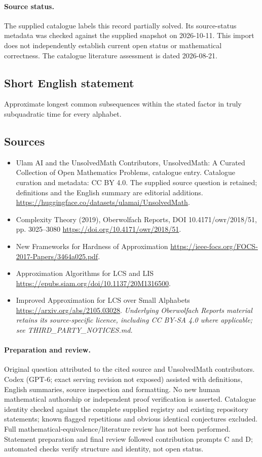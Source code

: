\documentclass[11pt]{article}
\begin{document}
\paragraph{Source status.}
The supplied catalogue labels this record partially solved. Its source-status metadata was checked against the supplied snapshot on 2026-10-11. This import does not independently establish current open status or mathematical correctness. The catalogue literature assessment is dated 2026-08-21.
\subsection{Short English statement}
Approximate longest common subsequences within the stated factor in truly subquadratic time for every alphabet.
\subsection{Sources}
\begin{itemize}
\item[S1] Ulam AI and the UnsolvedMath Contributors, UnsolvedMath: A Curated Collection of Open Mathematics Problems, catalogue entry. Catalogue curation and metadata: CC BY 4.0. The supplied source question is retained; definitions and the English summary are editorial additions.
\url{https://huggingface.co/datasets/ulamai/UnsolvedMath}.
\item[S2] Complexity Theory (2019), Oberwolfach Reports, DOI 10.4171/owr/2018/51, pp. 3025--3080
\url{https://doi.org/10.4171/owr/2018/51}.
\item[S3] New Frameworks for Hardness of Approximation
\url{https://ieee-focs.org/FOCS-2017-Papers/3464a025.pdf}.
\item[S4] Approximation Algorithms for LCS and LIS
\url{https://epubs.siam.org/doi/10.1137/20M1316500}.
\item[S5] Improved Approximation for LCS over Small Alphabets
\url{https://arxiv.org/abs/2105.03028}.
\textit{Underlying Oberwolfach Reports material retains its source-specific licence, including CC BY-SA 4.0 where applicable; see THIRD\_PARTY\_NOTICES.md.}
\end{itemize}
\paragraph{Preparation and review.}
Original question attributed to the cited source and UnsolvedMath contributors. Codex (GPT-6; exact serving revision not exposed) assisted with definitions, English summaries, source inspection and formatting. No new human mathematical authorship or independent proof verification is asserted. Catalogue identity checked against the complete supplied registry and existing repository statements; known flagged repetitions and obvious identical conjectures excluded. Full mathematical-equivalence/literature review has not been performed. Statement preparation and final review followed contribution prompts C and D; automated checks verify structure and identity, not open status.
\label{end:statement}
\end{document}
